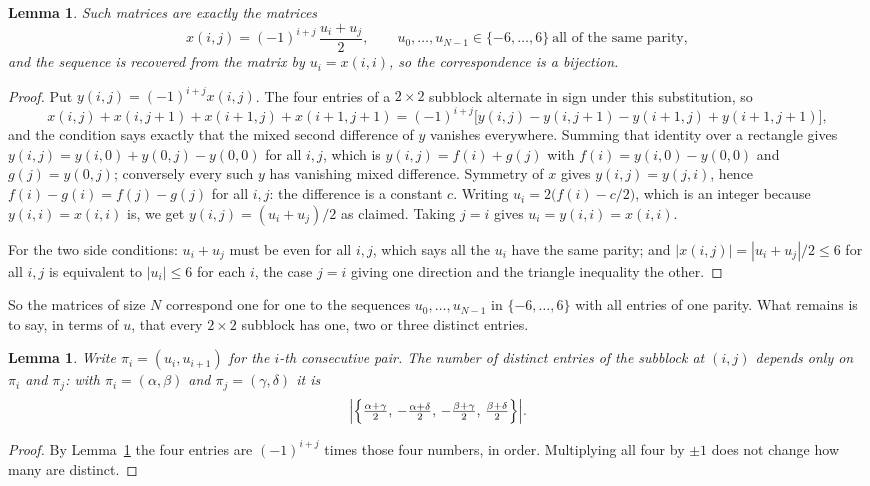 \documentclass[11pt,a4paper]{article}
\theoremstyle{plain}
\newtheorem{lemma}[theorem]{Lemma}
\theoremstyle{definition}
\begin{document}
\begin{lemma}\label{lem:solve}
Such matrices are exactly the matrices
\[
x(i,j)=(-1)^{i+j}\,\frac{u_i+u_j}{2},
\qquad u_0,\dots,u_{N-1}\in\{-6,\dots,6\}\ \text{all of the same parity},
\]
and the sequence is recovered from the matrix by $u_i=x(i,i)$, so the correspondence is a
bijection.
\end{lemma}

\begin{proof}
Put $y(i,j)=(-1)^{i+j}x(i,j)$. The four entries of a $2\times2$ subblock alternate in sign
under this substitution, so
\[
x(i,j)+x(i,j{+}1)+x(i{+}1,j)+x(i{+}1,j{+}1)
=(-1)^{i+j}\bigl[y(i,j)-y(i,j{+}1)-y(i{+}1,j)+y(i{+}1,j{+}1)\bigr],
\]
and the condition says exactly that the mixed second difference of $y$ vanishes everywhere.
Summing that identity over a rectangle gives
$y(i,j)=y(i,0)+y(0,j)-y(0,0)$ for all $i,j$, which is $y(i,j)=f(i)+g(j)$ with
$f(i)=y(i,0)-y(0,0)$ and $g(j)=y(0,j)$; conversely every such $y$ has vanishing mixed
difference. Symmetry of $x$ gives $y(i,j)=y(j,i)$, hence $f(i)-g(i)=f(j)-g(j)$ for all $i,j$:
the difference is a constant $c$. Writing $u_i=2\bigl(f(i)-c/2\bigr)$, which is an integer
because $y(i,i)=x(i,i)$ is, we get $y(i,j)=(u_i+u_j)/2$ as claimed. Taking $j=i$ gives
$u_i=y(i,i)=x(i,i)$.

For the two side conditions: $u_i+u_j$ must be even for all $i,j$, which says all the $u_i$ have
the same parity; and $|x(i,j)|=|u_i+u_j|/2\le6$ for all $i,j$ is equivalent to $|u_i|\le6$
for each $i$, the case $j=i$ giving one direction and the triangle inequality the other.
\end{proof}

So the matrices of size $N$ correspond one for one to the sequences $u_0,\dots,u_{N-1}$ in
$\{-6,\dots,6\}$ with all entries of one parity. What remains is to say, in terms of $u$,
that every $2\times2$ subblock has one, two or three distinct entries.

\begin{lemma}\label{lem:block}
Write $\pi_i=(u_i,u_{i+1})$ for the $i$-th consecutive pair. The number of distinct entries of
the subblock at $(i,j)$ depends only on $\pi_i$ and $\pi_j$: with $\pi_i=(\alpha,\beta)$ and
$\pi_j=(\gamma,\delta)$ it is
\[
\Bigl|\Bigl\{\tfrac{\alpha+\gamma}{2},\,-\tfrac{\alpha+\delta}{2},\,
-\tfrac{\beta+\gamma}{2},\,\tfrac{\beta+\delta}{2}\Bigr\}\Bigr| .
\]
\end{lemma}

\begin{proof}
By Lemma~\ref{lem:solve} the four entries are $(-1)^{i+j}$ times those four numbers, in
order. Multiplying all four by $\pm1$ does not change how many are distinct.
\end{proof}
\end{document}
